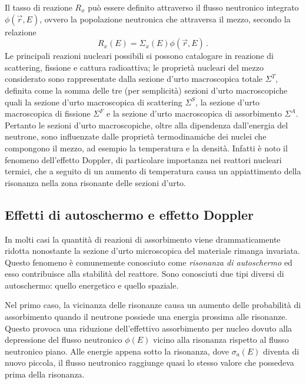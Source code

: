Il tasso di reazione $R_x$ può essere definito attraverso il 
flusso neutronico integrato $\phi(\vec{r},E)$, ovvero la popolazione neutronica 
che attraversa il mezzo, secondo la relazione
\begin{equation}
\label{tasso_di_reazione}
R_x(E)=\Sigma_x(E) \phi(\vec{r},E) \,.
\end{equation}
Le principali reazioni nucleari possibili si possono catalogare in reazione di 
scattering, fissione e cattura radioattiva; le proprietà nucleari del mezzo 
considerato sono rappresentate dalla sezione d'urto macroscopica totale 
$\Sigma^T$, definita come la somma delle tre (per semplicità) sezioni d'urto 
macroscopiche quali la sezione d'urto macroscopica di scattering $\Sigma^S$, la 
sezione d'urto macroscopica di fissione $\Sigma^F$ e la sezione d'urto 
macroscopica di assorbimento $\Sigma^A$.
Pertanto le sezioni d'urto macroscopiche, oltre alla dipendenza dall'energia 
del 
neutrone, sono influenzate dalle proprietà termodinamiche dei nuclei che 
compongono il mezzo, ad esempio la temperatura e la densità. Infatti è noto il 
fenomeno dell'effetto Doppler, di particolare importanza nei reattori nucleari 
termici, che a seguito di un aumento di temperatura 
causa un appiattimento della risonanza nella zona risonante delle sezioni d'urto.

\subsection{Effetti di autoschermo e effetto Doppler}

In molti casi la quantità di reazioni di assorbimento viene drammaticamente 
ridotta nonostante la sezione d'urto microscopica del materiale rimanga 
invariata. Questo fenomeno è comunemente conosciuto come \textit{risonanza di 
autoschermo} ed esso contribuisce alla stabilità del reattore. 
Sono conosciuti due tipi diversi di autoschermo: quello energetico e quello 
spaziale.

Nel primo caso, la vicinanza delle risonanze causa un aumento delle probabilità 
di assorbimento quando il neutrone possiede una energia prossima alle 
risonanze. 
Questo provoca una riduzione dell'effettivo assorbimento per nucleo dovuto alla 
depressione del flusso neutronico $\phi(E)$ vicino alla risonanza rispetto al 
flusso neutronico piano. 
Alle energie appena sotto la risonanza, dove $\sigma_a(E)$ diventa di nuovo 
piccola, il flusso neutronico raggiunge quasi lo stesso valore che possedeva 
prima della risonanza.

